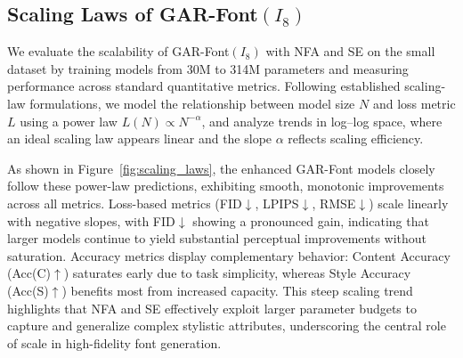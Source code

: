 \subsection{Scaling Laws of GAR-Font\texorpdfstring{$(I_8)$}{(I8)}}
\label{ssec:scaling_law}
We evaluate the scalability of GAR-Font$(I_8)$ with NFA and SE on the small dataset by training models from 30M to 314M parameters and measuring performance across standard quantitative metrics. Following established scaling-law formulations, we model the relationship between model size $N$ and loss metric $L$ using a power law $L(N)\propto N^{-\alpha}$, and analyze trends in log–log space, where an ideal scaling law appears linear and the slope $\alpha$ reflects scaling efficiency.

As shown in Figure~\ref{fig:scaling_laws}, the enhanced GAR-Font models closely follow these power-law predictions, exhibiting smooth, monotonic improvements across all metrics. Loss-based metrics (FID$\downarrow$, LPIPS$\downarrow$, RMSE$\downarrow$) scale linearly with negative slopes, with FID$\downarrow$ showing a pronounced gain, indicating that larger models continue to yield substantial perceptual improvements without saturation. Accuracy metrics display complementary behavior: Content Accuracy (Acc(C)$\uparrow$) saturates early due to task simplicity, whereas Style Accuracy (Acc(S)$\uparrow$) benefits most from increased capacity. This steep scaling trend highlights that NFA and SE effectively exploit larger parameter budgets to capture and generalize complex stylistic attributes, underscoring the central role of scale in high-fidelity font generation.







